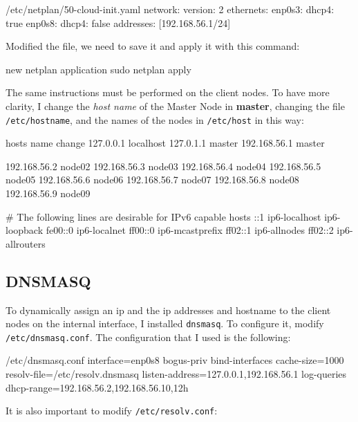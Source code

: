 \begin{codice}[style=bashstyle]{/etc/netplan/50-cloud-init.yaml}
    network:
    version: 2
    ethernets:
    enp0s3:
    dhcp4: true
    enp0s8:
    dhcp4: false
    addresses: [192.168.56.1/24]
\end{codice}

Modified the file, we need to save it and apply it with this command:

\begin{codice}[style=bashstyle]{new netplan application}
    sudo netplan apply
\end{codice}

The same instructions must be performed on the client nodes.
To have more clarity, I change the \textit{host name} of the Master Node in \textbf{master}, changing the file \texttt{/etc/hostname}, and the names of the nodes in \texttt{/etc/host} in this way:

\begin{codice}[style=bashstyle]{hosts name change}
    127.0.0.1 localhost
    127.0.1.1 master
    192.168.56.1 master

    192.168.56.2 node02
    192.168.56.3 node03
    192.168.56.4 node04
    192.168.56.5 node05
    192.168.56.6 node06
    192.168.56.7 node07
    192.168.56.8 node08
    192.168.56.9 node09

    # The following lines are desirable for IPv6 capable hosts
    ::1     ip6-localhost ip6-loopback
    fe00::0 ip6-localnet
    ff00::0 ip6-mcastprefix
    ff02::1 ip6-allnodes
    ff02::2 ip6-allrouters
\end{codice}

\subsection{DNSMASQ}
To dynamically assign an ip and the ip addresses and hostname to the client nodes on the internal interface, I installed \texttt{dnsmasq}. To configure it, modify \texttt{/etc/dnsmasq.conf}. The configuration that I used is the following:

\begin{codice}[]{/etc/dnsmasq.conf}
    interface=enp0s8
    bogus-priv
    bind-interfaces
    cache-size=1000
    resolv-file=/etc/resolv.dnsmasq
    listen-address=127.0.0.1,192.168.56.1
    log-queries
    dhcp-range=192.168.56.2,192.168.56.10,12h
\end{codice}

It is also important to modify \texttt{/etc/resolv.conf}:

